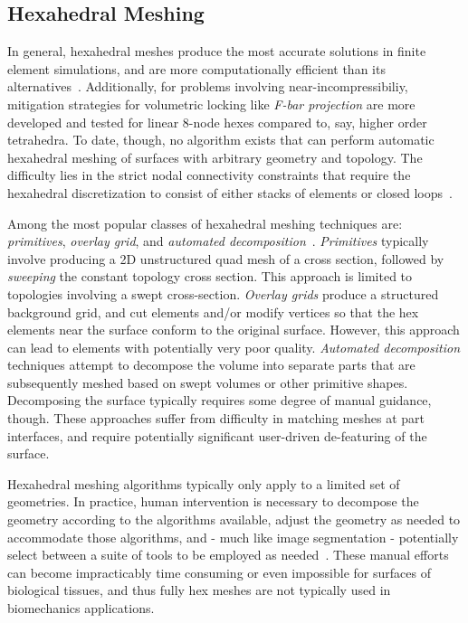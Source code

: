 \subsection{Hexahedral Meshing}
\label{Hexahedral Meshing}

In general, hexahedral meshes produce the most accurate solutions in finite element simulations, and are more computationally efficient than its alternatives~\cite{tautges_2001}. Additionally, for problems involving near-incompressibiliy, mitigation strategies for volumetric locking like \textit{F-bar projection} are more developed and tested for linear 8-node hexes compared to, say, higher order tetrahedra. To date, though, no algorithm exists that can perform automatic hexahedral meshing of surfaces with arbitrary geometry and topology. The difficulty lies in the strict nodal connectivity constraints that require the hexahedral discretization to consist of either stacks of elements or closed loops~\cite{young_2008}. 

Among the most popular classes of hexahedral meshing techniques are: \textit{primitives}, \textit{overlay grid}, and \textit{automated decomposition}~\cite{blacker_2001}. \textit{Primitives} typically involve producing a 2D unstructured quad mesh of a cross section, followed by \textit{sweeping} the constant topology cross section. This approach is limited to topologies involving a swept cross-section. \textit{Overlay grids} produce a structured background grid, and cut elements and/or modify vertices so that the hex elements near the surface conform to the original surface. However, this approach can lead to elements with potentially very poor quality. \textit{Automated decomposition} techniques attempt to decompose the volume into separate parts that are subsequently meshed based on swept volumes or other primitive shapes. Decomposing the surface typically requires some degree of manual guidance, though. These approaches suffer from difficulty in matching meshes at part interfaces, and require potentially significant user-driven de-featuring of the surface.

Hexahedral meshing algorithms typically only apply to a limited set of geometries. In practice, human intervention is necessary to decompose the geometry according to the algorithms available, adjust the geometry as needed to accommodate those algorithms, and - much like image segmentation - potentially select between a suite of tools to be employed as needed~\cite{blacker_2001}. These manual efforts can become impracticably time consuming or even impossible for surfaces of biological tissues, and thus fully hex meshes are not typically used in biomechanics applications.

